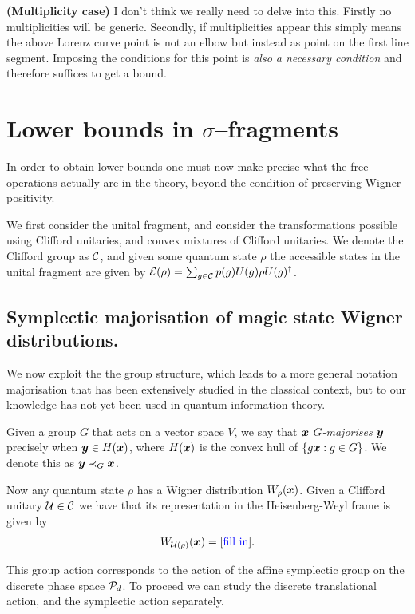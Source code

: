 \documentclass[pra,
aps,
twocolumn,
superscriptaddress,
groupedaddress,
nofootinbib,
reprint
]{revtex4-1}
\begin{document}
\textbf{(Multiplicity case)} I don't think we really need to delve into this. Firstly no multiplicities will be generic. Secondly, if multiplicities appear this simply means the above Lorenz curve point is not an elbow but instead as point on the first line segment. Imposing the conditions for this point is \emph{also a necessary condition} and therefore suffices to get a bound.

\section{Lower bounds in $\sigma$--fragments}

In order to obtain lower bounds one must now make precise what the free operations actually are in the  theory, beyond the condition of preserving Wigner-positivity.

We first consider the unital fragment, and consider the transformations possible using Clifford unitaries, and convex mixtures of Clifford unitaries. We denote the Clifford group as $\C$, and given some quantum state $\rho$ the accessible states in the unital fragment are given by $\E(\rho) = \sum_{g \in \C} p(g) U(g) \rho U(g)^\dagger$.

\subsection{Symplectic majorisation of magic state Wigner distributions.}
We now exploit the the group structure, which leads to a more general notation majorisation that has been extensively studied in the classical context, but to our knowledge has not yet been used in quantum information theory.

\begin{definition} Given a group $G$ that acts on a vector space $V$, we say that $\bmx$ \emph{$G$-majorises} $\bmy$ precisely when $\y \in H(\x)$, where $H(\x)$ is the convex hull of $\{g \x : g \in G\}$. We denote this as $\y \prec_G \x$.
\end{definition}

Now any quantum state $\rho$ has a Wigner distribution $W_\rho(\x)$. Given a Clifford unitary $\U \in \C$ we have that its representation in the Heisenberg-Weyl frame is given by
\begin{equation}
W_{\U(\rho)} (\x) = [\mbox{\ddd{fill in}}].
\end{equation}

This group action corresponds to the action of the affine symplectic group on the discrete phase space $\P_d$. To proceed we can study the discrete translational action, and the symplectic action separately.
\end{document}
